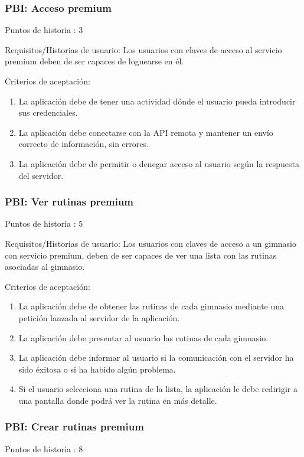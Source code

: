 \documentclass[11pt,a4paper]{report}
\begin{document}
\subsubsection{PBI: Acceso premium}
Puntos de historia : 3

Requisitos/Historias de usuario: Los usuarios con claves de acceso al servicio premium deben de ser capaces de loguearse en él.

Criterios de aceptación:
\begin{enumerate}
	\item La aplicación debe de tener una actividad dónde el usuario pueda introducir sus credenciales.
	
	\item La aplicación debe conectarse con la API remota y mantener un envío correcto de información, sin errores.
	
	\item La aplicación debe de permitir o denegar acceso al usuario según la respuesta del servidor.
	
\end{enumerate}
\subsubsection{PBI: Ver rutinas premium}
Puntos de historia : 5

Requisitos/Historias de usuario: Los usuarios con claves de acceso a un gimnasio con servicio premium, deben de ser capaces de ver una lista con las rutinas asociadas al gimnasio.

Criterios de aceptación:
\begin{enumerate}
	\item La aplicación debe de obtener las rutinas de cada gimnasio mediante una petición lanzada al servidor de la aplicación.
	
	\item La aplicación debe presentar al usuario las rutinas de cada gimnasio.
	
	\item La aplicación debe informar al usuario si la comunicación con el servidor ha sido éxitosa o si ha habido algún problema.
	\item Si el usuario selecciona una rutina de la lista, la aplicación le debe redirigir a una pantalla donde podrá ver la rutina en más detalle.
	
\end{enumerate}
\subsubsection{PBI: Crear rutinas premium}
Puntos de historia : 8
\end{document}
